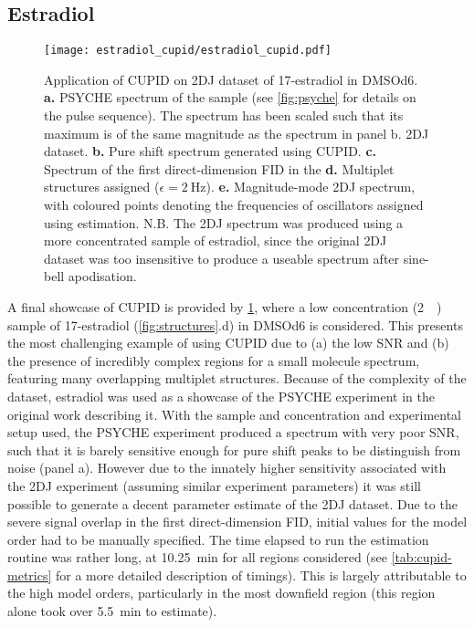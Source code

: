 \subsection{Estradiol}
\begin{figure}
    \texttt{[image: estradiol\_cupid/estradiol\_cupid.pdf]}%
    \caption[
        Application of \acs{CUPID} on a 17\textbeta-estradiol dataset.
    ]{
        Application of \acs{CUPID} on \ac{2DJ} dataset of 17\textbeta-estradiol
        in \acs{DMSOd6}.
        \textbf{a.} \acs{PSYCHE} spectrum of the sample (see
        \cref{fig:psyche} for details on the pulse sequence). The spectrum has
        been scaled such that its maximum is of the same magnitude as the
        spectrum in panel b.
        \ac{2DJ} dataset.
        \textbf{b.} Pure shift spectrum generated using \ac{CUPID}.
        \textbf{c.} Spectrum of the first direct-dimension \ac{FID} in the
        \textbf{d.} Multiplet structures assigned ($\epsilon =
        \qty{2}{\hertz}$).
        \textbf{e.} Magnitude-mode \ac{2DJ} spectrum, with coloured points
        denoting the frequencies of oscillators assigned using estimation.
        N.B. The \ac{2DJ} spectrum was produced using a more concentrated
        sample of estradiol, since the original \ac{2DJ} dataset was too
        insensitive to produce a useable spectrum after sine-bell apodisation.
    }
    \label{fig:estradiol-cupid}%
\end{figure}

A final showcase of \ac{CUPID} is provided by \cref{fig:estradiol-cupid},
where a low concentration (\qty{2}{\milli\molar}) sample of
17\textbeta-estradiol (\cref{fig:structures}.d) in \acs{DMSOd6} is
considered. This presents the most challenging example of using \ac{CUPID} due
to (a) the low \ac{SNR} and (b) the presence of incredibly complex regions for
a small molecule spectrum, featuring many overlapping multiplet structures.
Because of the complexity of the dataset, estradiol was used as a showcase of
the \ac{PSYCHE} experiment in the original work describing
it\cite{Foroozandeh2014}. With the sample and concentration and experimental
setup used, the \ac{PSYCHE} experiment produced a spectrum with very poor
\ac{SNR}, such that it is barely sensitive enough for pure shift peaks to be
distinguish from noise (panel a). However due to the innately higher
sensitivity associated with the \ac{2DJ} experiment (assuming similar
experiment parameters) it was still possible to generate a decent parameter
estimate of the \ac{2DJ} dataset. Due to the severe signal overlap in the first
direct-dimension \ac{FID}, initial values for the model order had to be
manually specified.  The time elapsed to run the estimation routine was rather
long, at \qty{10.25}{\minute} for all regions considered (see
\cref{tab:cupid-metrics} for a more detailed description of timings). This is
largely attributable to the high model orders, particularly in the most
downfield region (this region alone took over \qty{5.5}{\minute} to estimate).
